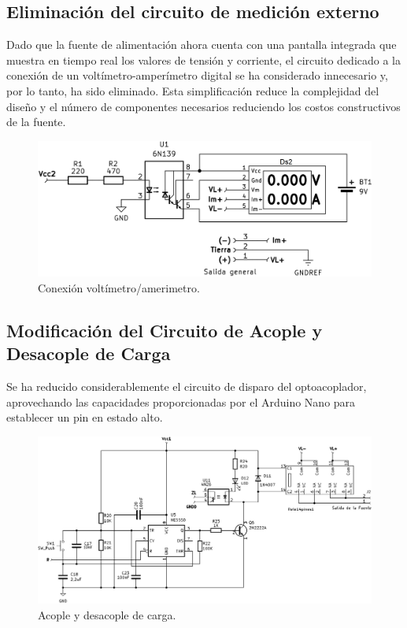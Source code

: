 \subsection{Eliminación del circuito de medición externo}
Dado que la fuente de alimentación ahora cuenta con una pantalla integrada que muestra en tiempo real los valores de tensión y corriente, el circuito dedicado a la conexión de un voltímetro-amperímetro digital se ha considerado innecesario y, por lo tanto, ha sido eliminado. Esta simplificación reduce la complejidad del diseño y el número de componentes necesarios reduciendo los costos constructivos de la fuente.
\begin{figure}[H]
    \centering
    \includegraphics[scale=0.2]{./imagenes/voltimetro_amperimetro.jpg}
    \caption{Conexión voltímetro/amerimetro.}
    \label{F:voltimetro_amperimetro}
\end{figure}

\subsection{Modificación del Circuito de Acople y Desacople de Carga}
Se ha reducido considerablemente el circuito de disparo del optoacoplador, aprovechando las capacidades proporcionadas por el Arduino Nano para establecer un pin en estado alto.
\begin{figure}[H]
    \centering
    \includegraphics[scale=0.3]{./imagenes/conexion_carga.jpg}
    \caption{Acople y desacople de carga.}
    \label{F:conexion_carga}
\end{figure}

